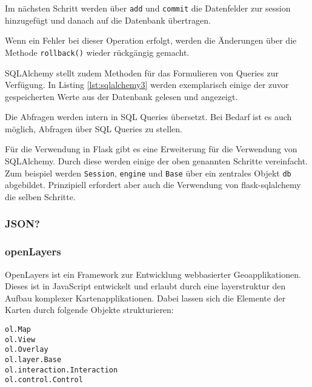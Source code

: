     Im nächsten Schritt werden über \texttt{add} und \texttt{commit} die Datenfelder zur session hinzugefügt und danach auf die Datenbank übertragen.
    
    Wenn ein Fehler bei dieser Operation erfolgt, werden die Änderungen über die Methode \texttt{rollback()} wieder rückgängig gemacht.

    
    
    
    SQLAlchemy stellt zudem Methoden für das Formulieren von Queries zur Verfügung. In Listing \ref{lst:sqlalchemy3} werden exemplarisch einige der zuvor gespeicherten Werte aus der Datenbank gelesen und angezeigt.
    
    Die Abfragen werden intern in SQL Queries übersetzt. Bei Bedarf ist es auch möglich, Abfragen über SQL Queries zu stellen.
    
    
    
    
    
    Für die Verwendung in Flask gibt es eine Erweiterung für die Verwendung von SQLAlchemy. Durch diese werden einige der oben genannten Schritte vereinfacht. Zum beispiel werden \texttt{Session}, \texttt{engine} und \texttt{Base} über ein zentrales Objekt \texttt{db} abgebildet. Prinzipiell erfordert aber auch die Verwendung von flask-sqlalchemy die selben Schritte.
    
    
    \subsubsection{JSON?}

    \subsubsection{openLayers}
    
    OpenLayers ist ein Framework zur Entwicklung webbasierter Geoapplikationen. Dieses ist in JavaScript entwickelt und erlaubt durch eine layerstruktur den Aufbau komplexer Kartenapplikationen. Dabei lassen sich die Elemente der Karten durch folgende Objekte strukturieren:
    
    \begin{description}
     \item [\texttt{ol.Map}]  
     \item [\texttt{ol.View}] 
     \item [\texttt{ol.Overlay}]
     \item [\texttt{ol.layer.Base}]
     \item [\texttt{ol.interaction.Interaction}]
     \item [\texttt{ol.control.Control}]
    \end{description}

